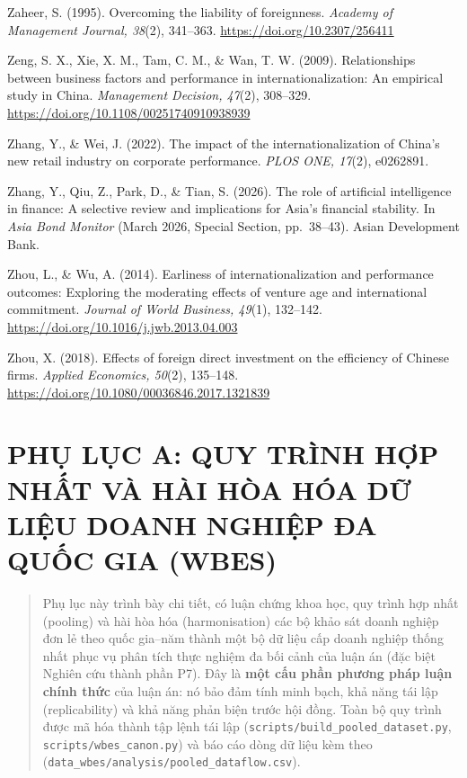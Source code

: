 \documentclass[
  a4paper,
  13pt]{extreport}
\begin{document}
Zaheer, S. (1995). Overcoming the liability of foreignness.
\emph{Academy of Management Journal, 38}(2), 341--363.
\url{https://doi.org/10.2307/256411}

Zeng, S. X., Xie, X. M., Tam, C. M., \& Wan, T. W. (2009). Relationships
between business factors and performance in internationalization: An
empirical study in China. \emph{Management Decision, 47}(2), 308--329.
\url{https://doi.org/10.1108/00251740910938939}

Zhang, Y., \& Wei, J. (2022). The impact of the internationalization of
China's new retail industry on corporate performance. \emph{PLOS ONE,
17}(2), e0262891.

Zhang, Y., Qiu, Z., Park, D., \& Tian, S. (2026). The role of artificial
intelligence in finance: A selective review and implications for Asia's
financial stability. In \emph{Asia Bond Monitor} (March 2026, Special
Section, pp.~38--43). Asian Development Bank.

Zhou, L., \& Wu, A. (2014). Earliness of internationalization and
performance outcomes: Exploring the moderating effects of venture age
and international commitment. \emph{Journal of World Business, 49}(1),
132--142. \url{https://doi.org/10.1016/j.jwb.2013.04.003}

Zhou, X. (2018). Effects of foreign direct investment on the efficiency
of Chinese firms. \emph{Applied Economics, 50}(2), 135--148.
\url{https://doi.org/10.1080/00036846.2017.1321839}

\newpage

\hypertarget{phux1ee5-lux1ee5c-a-quy-truxecnh-hux1ee3p-nhux1ea5t-vuxe0-huxe0i-huxf2a-huxf3a-dux1eef-liux1ec7u-doanh-nghiux1ec7p-ux111a-quux1ed1c-gia-wbes}{%
\chapter{PHỤ LỤC A: QUY TRÌNH HỢP NHẤT VÀ HÀI HÒA HÓA DỮ LIỆU DOANH
NGHIỆP ĐA QUỐC GIA
(WBES)}\label{phux1ee5-lux1ee5c-a-quy-truxecnh-hux1ee3p-nhux1ea5t-vuxe0-huxe0i-huxf2a-huxf3a-dux1eef-liux1ec7u-doanh-nghiux1ec7p-ux111a-quux1ed1c-gia-wbes}}

\begin{quote}
Phụ lục này trình bày chi tiết, có luận chứng khoa học, quy trình hợp
nhất (pooling) và hài hòa hóa (harmonisation) các bộ khảo sát doanh
nghiệp đơn lẻ theo quốc gia--năm thành một bộ dữ liệu cấp doanh nghiệp
thống nhất phục vụ phân tích thực nghiệm đa bối cảnh của luận án (đặc
biệt Nghiên cứu thành phần P7). Đây là \textbf{một cấu phần phương pháp
luận chính thức} của luận án: nó bảo đảm tính minh bạch, khả năng tái
lập (replicability) và khả năng phản biện trước hội đồng. Toàn bộ quy
trình được mã hóa thành tập lệnh tái lập
(\texttt{scripts/build\_pooled\_dataset.py},
\texttt{scripts/wbes\_canon.py}) và báo cáo dòng dữ liệu kèm theo
(\texttt{data\_wbes/analysis/pooled\_dataflow.csv}).
\end{quote}
\end{document}
